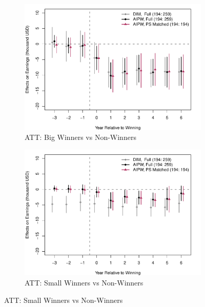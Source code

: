 \documentclass[letterpaper,12pt,leqno]{article}
\begin{document}
\begin{figure}[!ht]
    \caption{ATT and CATT Estimates: IRS Data}\label{fig:irs.est}
    \centering\vspace{-0.5em}
    \begin{minipage}[c]{1\textwidth}
        \centering
        \hspace{-2em}\begin{subfigure}{0.45\linewidth}
            \includegraphics[width=1\linewidth]{irs1_dyn2.pdf}
            \caption{ATT: Big Winners vs Non-Winners}
        \end{subfigure}\hspace{1em}
        \begin{subfigure}{0.45\linewidth}
            \includegraphics[width=1\linewidth]{irs2_dyn2.pdf}
            \caption{ATT: Small Winners vs Non-Winners}

\end{subfigure}
\end{minipage}
\end{figure}
\end{document}
